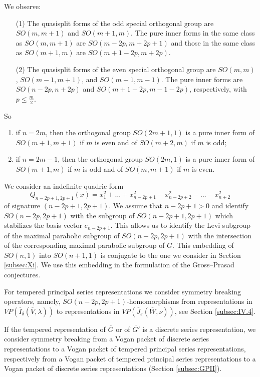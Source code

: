 \medskip

We observe:
\begin{enumerate}
\item
[(1)] The quasisplit forms of the odd special orthogonal group are 
$SO(m,m+1)$ and $SO(m+1,m)$. 
The 
 pure inner forms in the same class
 as $SO(m,m+1)$
 are $SO(m-2p, m+2p+1)$ 
 and those in the same class as $SO(m+1,m)$ are  $SO(m+1-2p, m+2p)$.

\item
[(2)]  
The quasisplit forms 
 of the even special orthogonal group are $SO(m,m)$, 
 $SO(m-1,m+1)$, and $SO(m+1,m-1)$. 
The pure inner forms are $SO(n-2p, n+2p)$ and  $SO(m+1-2p, m-1 -2p)$,
respectively,
 with $p \leq \frac m 2$.
 \end{enumerate}

So
\begin{enumerate}
\item if $n=2m$, then
 the orthogonal group $SO(2m+1,1)$ is a pure inner form of $SO(m+1,m+1)$
 if $m$ is even and of $SO(m+2,m)$ if $m$ is odd; 
\item if $n= 2m-1$, then the orthogonal group $SO(2m,1)$ is a pure inner form of $SO(m+1,m)$ if $m$ is odd and of $SO(m,m+1)$ if $m$ is even.
\end{enumerate}

\medskip
We  consider an  indefinite quadric form 
\[ 
Q_{n-2p+1,2p+1}(x)
=x^2_1+ \dots + x^2_{n-2p+1} -x^2_{n-2p+2}-  \dots -x^2_{n+2}
\]
 of signature $(n-2p +1, 2p+1)$.
We assume that $n-2p +1> 0$ and identify
 $SO(n-2p,2p+1)$ with the subgroup of $SO(n-2p+1,2p+1)$ which stabilizes 
 the basis vector $e_{n-2p+1}$.  
This  allows us to  identify the Levi subgroup of the maximal parabolic subgroup of $SO(n-2p,2p+1)$ with the intersection of the corresponding maximal parabolic subgroup of $\overline{G}$. 
This embedding of $SO(n,1)$ into $SO(n+1,1)$  is conjugate to the one
 we consider in Section \ref{subsec:Xi}.  
We use this embedding in the  formulation of the Gross--Prasad conjectures.  



For tempered principal series representations we 
 consider symmetry breaking operators, 
 namely, 
 $SO(n-2p,2p+1)$-homomorphisms from representations
 in 
 $VP(\overline{I}_\delta(\overline{V},\lambda))$
 to representations
 in $VP(\overline{J}_\varepsilon(\overline{W},\nu))$, 
 see Section \ref{subsec:IV.4}.  



If the tempered representation
 of $\overline{G}$ or of $\overline{G'}$ is
 a discrete series representation, 
 we consider symmetry breaking from
 a Vogan packet of discrete series representations
 to a Vogan packet of tempered principal series representations,
 respectively from a Vogan packet
 of tempered principal series representations
 to a Vogan packet of discrete series representations
 (Section \ref{subsec:GPII}). 




